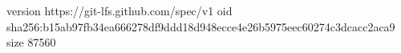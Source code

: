 version https://git-lfs.github.com/spec/v1
oid sha256:b15ab97fb34ea666278df9ddd18d948ecce4e26b5975eec60274c3dcacc2aca9
size 87560
